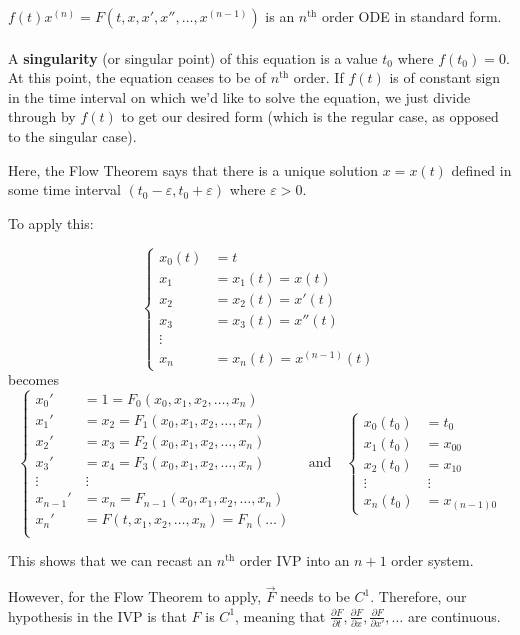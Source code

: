 \documentclass[12pt]{article}
\begin{document}
$f(t)x^{(n)} = F(t,x,x',x'',\dots,x^{(n-1)})$ is an $n^{\text{th}}$ order ODE in standard form. \\ \\
A \textbf{singularity} (or singular point) of this equation is a value $t_0$ where $f(t_0) = 0$. At this point, the equation ceases to be of $n^{\text{th}}$ order. If $f(t)$ is of constant sign in the time interval on which we'd like to solve the equation, we just divide through by $f(t)$ to get our desired form (which is the regular case, as opposed to the singular case).

Here, the Flow Theorem says that there is a unique solution $x = x(t)$ defined in some time interval $(t_0 - \varepsilon,t_0 + \varepsilon)$ where $\varepsilon > 0$.

To apply this:

\[
\begin{cases}
x_0(t) &= t \\
x_1 &= x_1(t) = x(t) \\
x_2 &= x_2(t) = x'(t) \\
x_3 &= x_3(t) = x''(t) \\
\vdots \\
x_n &= x_n(t) = x^{(n-1)}(t) 
\end{cases} \]
becomes
\[
\begin{cases}
x_0' &= 1 = F_0(x_0,x_1,x_2,\dots,x_n) \\
x_1' &= x_2 = F_1(x_0,x_1,x_2,\dots,x_n) \\
x_2' &= x_3 = F_2(x_0,x_1,x_2,\dots,x_n) \\
x_3' &= x_4 = F_3(x_0,x_1,x_2,\dots,x_n) \\
\vdots &\ \vdots \\
x_{n-1}' &= x_n = F_{n-1}(x_0,x_1,x_2,\dots,x_n)\\
x_n' &= F(t,x_1,x_2,\dots, x_n) = F_n(\dots) \\
\end{cases}
\quad \text{and} \quad
\begin{cases}
x_0(t_0) &= t_0 \\
x_1(t_0) &= x_{00} \\
x_2(t_0) &= x_{10} \\
\vdots &\ \vdots \\
x_n(t_0) &= x_{(n-1)0}
\end{cases}
\]

This shows that we can recast an $n^{\text{th}}$ order IVP into an $n+1$ order system.

However, for the Flow Theorem to apply, $\vec{F}$ needs to be $C^1$. Therefore, our hypothesis in the IVP is that $F$ is $C^1$, meaning that $\frac{\partial F}{\partial t}, \frac{\partial F}{\partial x}, \frac{\partial F}{\partial x'}, \dots$ are continuous.
\end{document}
